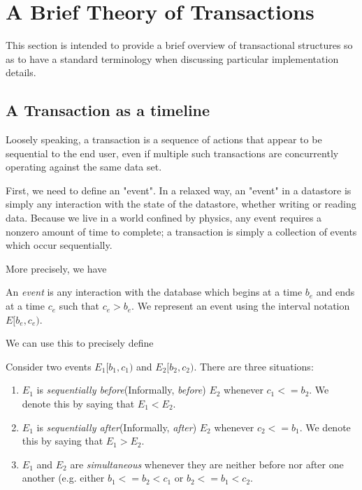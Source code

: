 \section{A Brief Theory of Transactions}

This section is intended to provide a brief overview of transactional structures so as to have a standard terminology when discussing particular implementation details.

\subsection{A Transaction as a timeline}
Loosely speaking, a transaction is a sequence of actions that appear to be sequential to the end user, even if multiple such transactions are concurrently operating against the same data set.

First, we need to define an "event". In a relaxed way, an "event" in a datastore is simply any interaction with the state of the datastore, whether writing or reading data. Because we live in a world confined by physics, any event requires a nonzero amount of time to complete; a transaction is simply a collection of events which occur sequentially.

More precisely, we have

\begin{defn}[Event]
An \emph{event} is any interaction with the database which begins at a time $b_e$ and ends at a time $c_e$ such that $c_e > b_e$. We represent an event using the interval notation $E[b_e,c_e)$.
\end{defn}

We can use this to precisely define 
\begin{defn}
Consider two events $E_1[b_1,c_1)$ and $E_2[b_2,c_2)$. There are three situations:

\begin{enumerate}
\item $E_1$ is \emph{sequentially before}(Informally, \emph{before}) $E_2$ whenever $c_1 <= b_2$. We denote this by saying that $E_1 < E_2$.
\item $E_1$ is \emph{sequentially after}(Informally, \emph{after}) $E_2$ whenever $c_2 <= b_1$. We denote this by saying that $E_1 > E_2$. 
\item $E_1$ and $E_2$ are \emph{simultaneous} whenever they are neither before nor after one another (e.g. either $b_1 <=b_2 < c_1$ or $b_2 <= b_1 < c_2$.
\end{enumerate}
\end{defn}

